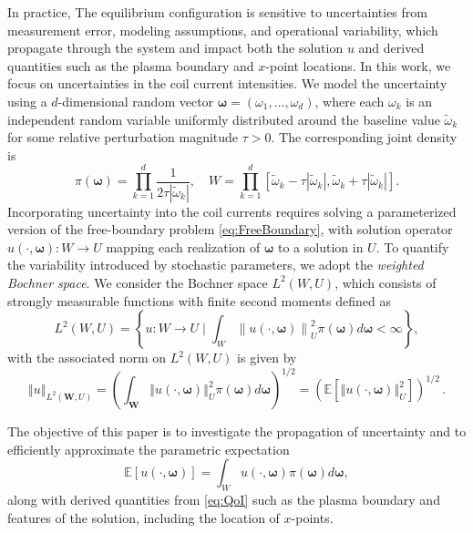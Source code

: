 In practice, The equilibrium configuration is sensitive to uncertainties from measurement error, modeling assumptions, and operational variability, which propagate through the system and impact both the solution $u$ and derived quantities such as the plasma boundary and $x$-point locations. In this work, we focus on uncertainties in the coil current intensities. We model the uncertainty using a $d$-dimensional random vector $\boldsymbol{\omega} = (\omega_1, \ldots, \omega_d)$, where each $\omega_k$ is an independent random variable uniformly distributed around the baseline value $\widetilde{\omega}_k$ for some relative perturbation magnitude $\tau > 0$. The corresponding joint density is
%
\[
\pi \left(\boldsymbol{\omega}\right)=\prod_{k=1}^{d} \frac{1}{2\tau |\widetilde{\omega}_k|},\quad W=\prod_{k=1}^{d}\left[\widetilde{\omega}_k-\tau \left\vert \widetilde{\omega}_k\right\vert,\widetilde{\omega}_k+\tau \left\vert \widetilde{\omega}_k \right\vert\right].
\]
%
Incorporating uncertainty into the coil currents requires solving a parameterized version of the free-boundary problem \eqref{eq:FreeBoundary}, with solution operator $u(\cdot,\boldsymbol{\omega}) : W \to U$ mapping each realization of $\boldsymbol{\omega}$ to a solution in $U$. To quantify the variability introduced by stochastic parameters, we adopt the {\it weighted Bochner space}. We consider the Bochner space $L^2(W,U)$, which consists of strongly measurable functions with finite second moments defined as
%
\[
L^2(W,U) = \left\{u:W\rightarrow U\; \bigg\vert \;\int_{W}\left\|u(\cdot,\boldsymbol{\omega})\right\|_{U}^2\pi(\boldsymbol{\omega})d\boldsymbol{\omega}<\infty\right\},
\]
%
with the associated norm on $L^2(W,U)$ is given by
%
\[
\left\Vert u \right\Vert_{L^2(\boldsymbol W,U)} =
    \left(\int_{\boldsymbol W} \left\Vert u(\cdot,\boldsymbol{\omega})  \right\Vert_{U}^2 \pi(\boldsymbol{\omega})d\boldsymbol{\omega} \right)^{1/2} = \left(\mathbb{E}\left[\left\Vert u(\cdot,\boldsymbol{\omega})  \right\Vert_{U}^2\right]\right)^{1/2}\,. 
\]
%

The objective of this paper is to investigate the propagation of uncertainty and to efficiently approximate the parametric expectation
%
 \begin{equation}
 \label{eq:QoI}
      \mathbb{E}\left[u(\cdot,\boldsymbol \omega)\right]=\int_W u(\cdot,\boldsymbol{\omega})\pi(\boldsymbol\omega)d\boldsymbol{\omega},
 \end{equation}
%
along with derived quantities from \eqref{eq:QoI} such as the plasma boundary and features of the solution, including the location of $x$-points.







